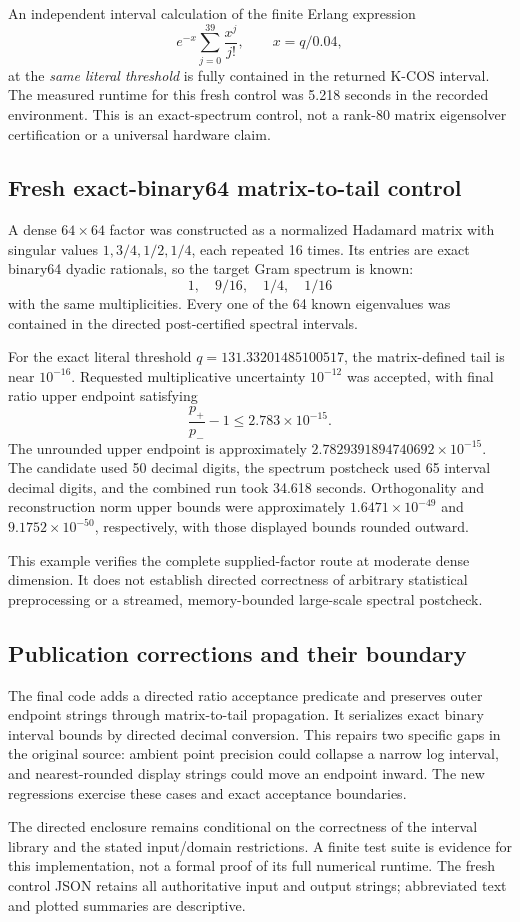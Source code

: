 An independent interval calculation of the finite Erlang expression
\[
e^{-x}\sum_{j=0}^{39}\frac{x^j}{j!},\qquad x=q/0.04,
\]
at the \emph{same literal threshold} is fully contained in the returned
K-COS interval.  The measured runtime for this fresh control was 5.218 seconds
in the recorded environment.  This is an exact-spectrum control, not a
rank-80 matrix eigensolver certification or a universal hardware claim.

\subsection{Fresh exact-binary64 matrix-to-tail control}
A dense \(64\times64\) factor was constructed as a normalized Hadamard matrix
with singular values \(1,3/4,1/2,1/4\), each repeated 16 times.  Its entries
are exact binary64 dyadic rationals, so the target Gram spectrum is known:
\[
1,\quad9/16,\quad1/4,\quad1/16
\]
with the same multiplicities.  Every one of the 64 known eigenvalues was
contained in the directed post-certified spectral intervals.

For the exact literal threshold \(q=131.33201485100517\), the matrix-defined
tail is near \(10^{-16}\).  Requested multiplicative uncertainty
\(10^{-12}\) was accepted, with final ratio upper endpoint satisfying
\[
\boxed{\frac{p_+}{p_-}-1\le2.783\times10^{-15}.}
\]
The unrounded upper endpoint is approximately
\(2.7829391894740692\times10^{-15}\).  The candidate used 50 decimal digits,
the spectrum postcheck used 65 interval decimal digits, and the combined run
took 34.618 seconds.  Orthogonality and reconstruction norm upper bounds were
approximately \(1.6471\times10^{-49}\) and \(9.1752\times10^{-50}\), respectively,
with those displayed bounds rounded outward.

This example verifies the complete supplied-factor route at moderate dense
dimension.  It does not establish directed correctness of arbitrary
statistical preprocessing or a streamed, memory-bounded large-scale
spectral postcheck.

\subsection{Publication corrections and their boundary}
The final code adds a directed ratio acceptance predicate and preserves outer
endpoint strings through matrix-to-tail propagation.  It serializes exact
binary interval bounds by directed decimal conversion.  This repairs two
specific gaps in the original source: ambient point precision could collapse
a narrow log interval, and nearest-rounded display strings could move an
endpoint inward.  The new regressions exercise these cases and exact
acceptance boundaries.

The directed enclosure remains conditional on the correctness of the
interval library and the stated input/domain restrictions.  A finite test
suite is evidence for this implementation, not a formal proof of its full
numerical runtime.  The fresh control JSON retains all authoritative input
and output strings; abbreviated text and plotted summaries are descriptive.
